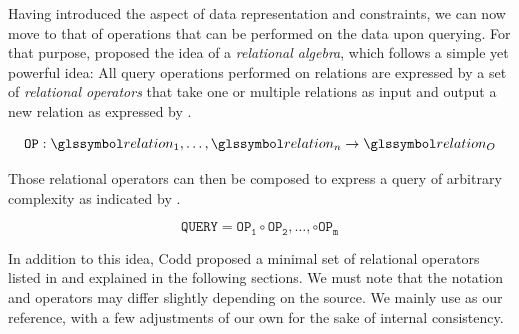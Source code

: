 Having introduced the aspect of data representation and constraints, we can now move to that of operations that can be performed on the data upon querying. For that purpose, \cite{Codd:1970Relational} proposed the idea of a \emph{relational algebra}, which follows a simple yet powerful idea: All query operations performed on relations are expressed by a set of \emph{relational operators} that take one or multiple relations as input and output a new relation as expressed by .

\begin{equation}
    \label{equation:rel_op}
    \mathtt{OP}: \relation_1, \ldots, \relation_n \rightarrow \relation_{O}
\end{equation}

Those relational operators can then be composed to express a query of arbitrary complexity as indicated by .

\begin{equation}
    \label{equation:rel_query}
    \mathtt{QUERY} = \mathtt{OP_{1}} \circ \mathtt{OP_{2}}, \ldots , \circ \mathtt{OP_{m}}
\end{equation}

In addition to this idea, Codd proposed a minimal set of relational operators listed in  and explained in the following sections. We must note that the notation and operators may differ slightly depending on the source. We mainly use \cite{Garcia:2009Database} as our reference, with a few adjustments of our own for the sake of internal consistency.


